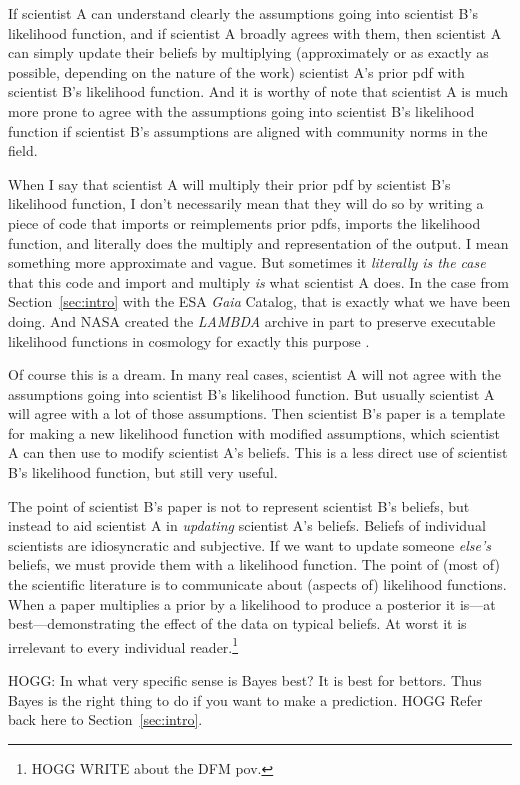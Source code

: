 \documentclass{article}
\newcommand{\sectionname}{Section}
\newcommand{\secref}[1]{\sectionname~\ref{#1}}
\begin{document}
If scientist A can understand clearly the assumptions going into scientist B's likelihood function,
and if scientist A broadly agrees with them,
then scientist A can simply update their beliefs by multiplying (approximately or as exactly as possible, depending on the nature of the work)
scientist A's prior pdf with scientist B's likelihood function.
And it is worthy of note that scientist A is much more prone to agree with the assumptions going into scientist B's likelihood function if scientist B's assumptions are aligned with community norms in the field.

When I say that scientist A will multiply their prior pdf by scientist B's likelihood function,
I don't necessarily mean that they will do so by writing a piece of code that imports or reimplements prior pdfs, imports the likelihood function, and literally does the multiply and representation of the output.
I mean something more approximate and vague.
But sometimes it \emph{literally is the case} that this code and import and multiply \emph{is} what scientist A does.
In the case from \secref{sec:intro} with the ESA \textsl{Gaia} Catalog, that is exactly what we have been doing.
And NASA created the \textsl{LAMBDA} archive in part to preserve executable likelihood functions in cosmology for exactly this purpose \cite{lambda}.

Of course this is a dream.
In many real cases, scientist A will not agree with the assumptions going into scientist B's likelihood function.
But usually scientist A will agree with a lot of those assumptions.
Then scientist B's paper is a template for making a new likelihood function with modified assumptions, which scientist A can then use to modify scientist A's beliefs.
This is a less direct use of scientist B's likelihood function, but still very useful.

The point of scientist B's paper is not to represent scientist B's beliefs, but instead to aid scientist A in \emph{updating} scientist A's beliefs.
Beliefs of individual scientists are idiosyncratic and subjective.
If we want to update someone \emph{else's} beliefs, we must provide them with a likelihood function.
The point of (most of) the scientific literature is to communicate about (aspects of) likelihood functions.
When a paper multiplies a prior by a likelihood to produce a posterior it is---at best---demonstrating the effect of the data on typical beliefs.
At worst it is irrelevant to every individual reader.\footnote{%
HOGG WRITE about the DFM pov.}

HOGG: In what very specific sense is Bayes best?
It is best for bettors.
Thus Bayes is the right thing to do if you want to make a prediction.
HOGG Refer back here to \secref{sec:intro}.
\end{document}

